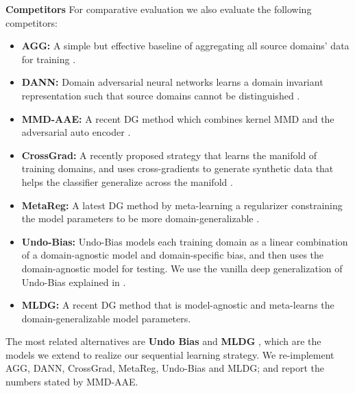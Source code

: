 \documentclass[runningheads]{llncs}
\newcommand{\cut}[1]{}
\newcommand{\keypoint}[1]{\vspace{0.1cm}\noindent\textbf{#1}\quad}
\begin{document}
\keypoint{Competitors}
For comparative evaluation we also evaluate the following competitors:
\begin{itemize}[noitemsep]\item \textbf{AGG:} A simple but effective baseline of aggregating all source domains' data for training \cite{da2017dg}. 
    \item \textbf{DANN:} Domain adversarial neural networks learns a domain invariant representation such that source domains cannot be distinguished \cite{ganin2016dann}. 
    \cut{\item \textbf{TF-CNN:} \cite{da2017dg} learns a domain-agnostic model by factoring out the common component from a set of domain-specific models, as well as tensor factorization to compress the model parameters.
    \item \textbf{Fusion:} \cite{Massimiliano2018ICIP} learns the domain-specific source domains and fuses them for testing on the target domain. }
    \item \textbf{MMD-AAE:} A recent DG method which combines kernel MMD and the adversarial auto encoder \cite{mmdaaecvpr2018}. 
    \item \textbf{CrossGrad:} A recently proposed strategy that learns the manifold of training domains, and uses cross-gradients to generate synthetic data that helps the classifier generalize across the manifold \cite{shiv2018dg}.
    \item \textbf{MetaReg:} A latest DG method by meta-learning a regularizer constraining the model parameters to be more domain-generalizable \cite{NIPS2018_metareg}.
    \item \textbf{Undo-Bias:} Undo-Bias models \cite{ECCV12_Khosla} each training domain as a linear combination of a domain-agnostic model and domain-specific bias, and then uses the domain-agnostic model for testing. We use the vanilla deep generalization of Undo-Bias explained in \cite{da2017dg}.
    \item \textbf{MLDG:} A recent DG method that is model-agnostic and meta-learns the domain-generalizable model parameters.
\end{itemize}
The most related alternatives are \textbf{Undo Bias} \cite{ECCV12_Khosla} and \textbf{MLDG} \cite{Li2018MLDG}, which are the models we extend to realize our sequential learning strategy. We re-implement AGG, DANN, CrossGrad, MetaReg, Undo-Bias and MLDG; and report the numbers stated by \cut{TF-CNN, Fusion and} MMD-AAE.
\end{document}

